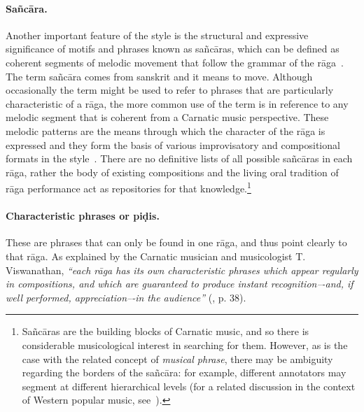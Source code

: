 


\paragraph*{Sañc\={a}ra.}
Another important feature of the style is the structural and expressive significance of motifs and phrases known as sañc\={a}ras, which can be defined as coherent segments of melodic movement that follow the grammar of the rāga~\citep{viswanathan-alapana,pesch-book}. The term sañcāra comes from sanskrit and it means to move.
Although occasionally the term might be used to refer to phrases that are particularly characteristic of a r\={a}ga, the more common use of the term is in reference to any melodic segment that is coherent from a Carnatic music perspective. These melodic patterns are the means through which the character of the r\={a}ga is expressed and they form the basis of various improvisatory and compositional formats in the style~\citep{viswanathan-alapana,ishwar-motif_alapana}. 
%
There are no definitive lists of all possible sañcāras in each rāga, rather the body of existing compositions and the living oral tradition of rāga performance act as repositories for that knowledge.\footnote{Sañcāras are the building blocks of Carnatic music, and so there is considerable musicological interest in searching for them. However, as is the case with the related concept of \textit{musical phrase}, there may be ambiguity regarding the borders of the sañcāra: for example, different annotators may segment at different hierarchical levels (for a related discussion in the context of Western popular music, see~\cite{bruderer-perception}).}

\paragraph*{Characteristic phrases or pi\d{d}is.}
These are phrases that can only be found in one rāga, and thus point clearly to that rāga. As explained by the Carnatic musician and musicologist T. Viswanathan, \textit{“each rāga has its own characteristic phrases which appear regularly in compositions, and which are guaranteed to produce instant recognition–-and, if well performed, appreciation–-in the audience”} (\cite{viswanathan-alapana}, p. 38).

